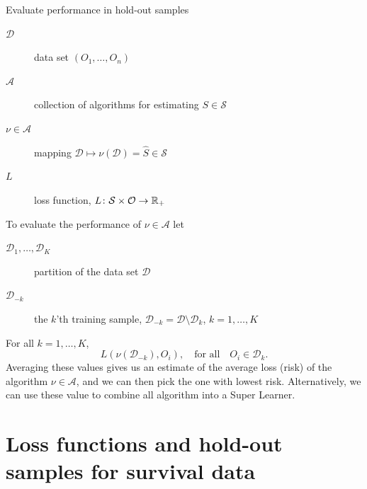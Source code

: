\documentclass[smaller]{beamer}\usepackage{listings}
\newcommand{\est}{\ensuremath{\nu}}
\begin{document}
\begin{frame}[label={sec:org6e93f5d}]{Evaluate performance in hold-out samples}
\small

\begin{description}
\item[{\(\mathcal{D}\)}] data set \((O_1, \dots, O_n)\)
\item[{\(\mathcal{A}\)}] collection of algorithms for estimating \(S \in \mathcal{S}\)
\item[{\(\nu \in \mathcal{A}\)}] mapping \(\mathcal{D} \longmapsto \est(\mathcal{D}) = \hat S \in
  \mathcal{S}\)
\item[{\(L\)}] loss function, \(L \colon \mathcal{S} \times \mathcal{O} \rightarrow \mathbb{R}_+\)
\end{description}

\vfill
To evaluate the performance of \(\est \in \mathcal{A}\) let
\begin{description}
\item[{\(\mathcal{D}_1, \dots, \mathcal{D}_K\)}] partition of the data set \(\mathcal{D}\)
\item[{\(\mathcal{D}_{-k}\)}] the \(k\)'th training sample, \(\mathcal{D}_{-k} = \mathcal{D} \setminus
  \mathcal{D}_{k}\), \(k=1, \dots, K\)
\end{description}

\vfill For all \(k =1, \dots, K\),
\begin{equation*}
L(\est(\mathcal{D}_{-k}), O_i),
\quad \text{for all} \quad O_i \in \mathcal{D}_k.
\end{equation*}
Averaging these values gives us an estimate of the average loss (risk) of the algorithm \(\nu \in
\mathcal{A}\), and we can then pick the one with lowest risk. Alternatively, we can use these value
to combine all algorithm into a Super Learner.
\end{frame}


\section{Loss functions and hold-out samples for survival data}
\label{sec:orgb593cc2}
\end{document}
